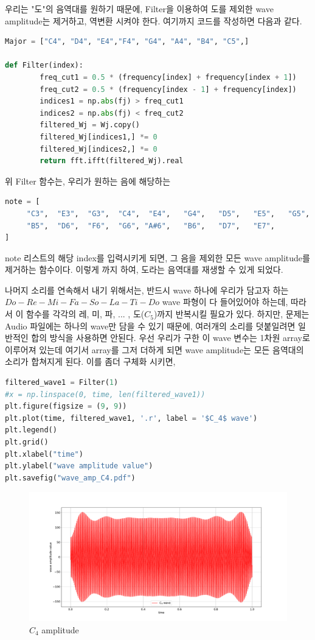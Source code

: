 \documentclass[11pt]{article}
\begin{document}
\pagebreak
우리는 "도"의 음역대를 원하기 때문에,  Filter을 이용하여 도를 제외한 wave amplitude는 제거하고, 역변환 시켜야 한다. 여기까지 코드를 작성하면 다음과 같다.
\begin{lstlisting}[language=Python]
Major = ["C4", "D4", "E4","F4", "G4", "A4", "B4", "C5",]

def Filter(index):
        freq_cut1 = 0.5 * (frequency[index] + frequency[index + 1])
        freq_cut2 = 0.5 * (frequency[index - 1] + frequency[index])
        indices1 = np.abs(fj) > freq_cut1
        indices2 = np.abs(fj) < freq_cut2
        filtered_Wj = Wj.copy()
        filtered_Wj[indices1,] *= 0
        filtered_Wj[indices2,] *= 0   
        return fft.ifft(filtered_Wj).real        
\end{lstlisting}
위 Filter 함수는, 우리가 원하는 음에 해당하는 

\begin{lstlisting}[language=Python]
note = [
     "C3",  "E3",  "G3",  "C4",  "E4",   "G4",   "D5",   "E5",   "G5",
     "B5",  "D6",  "F6",  "G6", "A#6",   "B6",   "D7",   "E7",
]
\end{lstlisting}
note 리스트의 해당 index를 입력시키게 되면, 그 음을 제외한 모든 wave amplitude를 제거하는 함수이다. 이렇게 까지 하여, 도라는 음역대를 재생할 수 있게 되었다.

나머지 소리를 연속해서 내기 위해서는, 반드시 wave 하나에 우리가 담고자 하는 $Do-Re-Mi-Fa-So-La-Ti-Do$ wave 파형이 다 들어있어야 하는데, 따라서 이 함수를 각각의 레, 미, 파, ... , 도($C_5$)까지 반복시킬 필요가 있다. 하지만, 문제는 Audio 파일에는 하나의 wave만 담을 수 있기 때문에, 여러개의 소리를 덧붙일려면 일반적인 합의 방식을 사용하면 안된다. 우선 우리가 구한 이 wave 변수는 1차원 array로 이루어져 있는데 여기서 array를 그저 더하게 되면 wave amplitude는 모든 음역대의 소리가 합쳐지게 된다. 이를 좀더 구체화 시키면,

\begin{lstlisting}[language=Python]
filtered_wave1 = Filter(1)
#x = np.linspace(0, time, len(filtered_wave1))
plt.figure(figsize = (9, 9))
plt.plot(time, filtered_wave1, '.r', label = '$C_4$ wave')
plt.legend()
plt.grid()
plt.xlabel("time")
plt.ylabel("wave amplitude value")
plt.savefig("wave_amp_C4.pdf")
\end{lstlisting}

\begin{figure}[!ht]
  \centering
  \includegraphics[width=1\textwidth]{wave_amp_C4.pdf}
  \caption{$C_{4}$ amplitude}
\end{figure}
\end{document}
